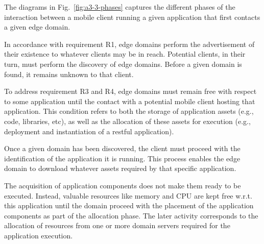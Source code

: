 %

The diagrams in Fig.~\ref{fig:a3-3-phases} captures the different phases of the interaction between a mobile client running a given application that first contacts a given edge domain. 
	
In accordance with requirement R1, edge domains perform the advertisement of their existence to whatever clients may be in reach. Potential clients, in their turn, must perform the discovery of edge domains. Before a given domain is found, it remains unknown to that client.

To address requirement R3 and R4, edge domains must remain free with respect to some application until the contact with a potential mobile client hosting that application. This condition refers to both the storage of application assets (e.g., code, libraries, etc), as well as the allocation of these assets for execution (e.g., deployment and instantiation of a restful application). 

Once a given domain has been discovered, the client must proceed with the identification of the application it is running. This process enables the edge domain to download whatever assets required by that specific application.  

The acquisition of application components does not make them ready to be executed. Instead, valuable resources like memory and CPU are kept free w.r.t. this application until the domain proceed with the placement of the application components as part of the allocation phase. The later activity corresponds to the allocation of resources from one or more domain servers required for the application execution. 	

